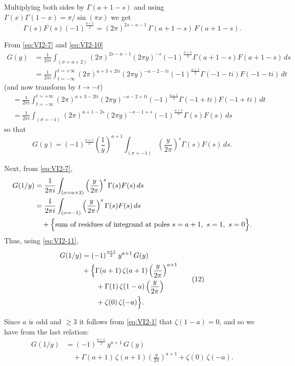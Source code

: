Multiplying both sides by $\Gamma(a+1-s)$ and using
$\Gamma(x)\Gamma(1-x)=\pi/\sin(\pi x)$ we get
\[
\Gamma(s)F(s)(-1)^{\frac{a+1}{2}}
=(2\pi)^{2s-a-1}\,\Gamma(a+1-s)\,F(a+1-s).
\tag{10}\label{eq:VI2-10}
\]

From \eqref{eq:VI2-7} and \eqref{eq:VI2-10}
\[
\begin{aligned}
G(y)&=\frac{1}{2\pi i}\int_{(\sigma=a+2)}
(2\pi)^{2s-a-1}(2\pi y)^{-s}(-1)^{\frac{a+1}{2}}
\Gamma(a+1-s)F(a+1-s)\,ds\\
&=\frac{1}{2\pi i}\int_{t=-\infty}^{t=+\infty}
(2\pi)^{a+3+2ti}(2\pi y)^{-a-2-ti}(-1)^{\frac{a+1}{2}}
\Gamma(-1-ti)F(-1-ti)\,dt
\end{aligned}
\]
(and now transform by $t\to -t$)
\[
\begin{aligned}
&=\frac{1}{2\pi i}\int_{t=-\infty}^{t=+\infty}
(2\pi)^{a+3-2ti}(2\pi y)^{-a-2+ti}(-1)^{\frac{a+1}{2}}
\Gamma(-1+ti)F(-1+ti)\,dt\\
&=\frac{1}{2\pi i}\int_{(\sigma=-1)}
(2\pi)^{a+1-2s}(2\pi y)^{-a-1+s}(-1)^{\frac{a+1}{2}}
\Gamma(s)F(s)\,ds
\end{aligned}
\]
so that
\[
G(y)=(-1)^{\frac{a+1}{2}}\left(\frac{1}{y}\right)^{a+1}
\int_{(\sigma=-1)}\left(\frac{y}{2\pi}\right)^{s}\Gamma(s)F(s)\,ds.
\tag{11}\label{eq:VI2-11}
\]

Next, from \eqref{eq:VI2-7},
\[
\begin{aligned}
G(1/y)&=\frac{1}{2\pi i}\int_{(\sigma=a+2)}\left(\frac{y}{2\pi}\right)^{s}
\Gamma(s)F(s)\,ds\\
&=\frac{1}{2\pi i}\int_{(\sigma=-1)}\left(\frac{y}{2\pi}\right)^{s}
\Gamma(s)F(s)\,ds\\
&\quad+\Bigl\{\text{sum of residues of integrand at poles }
s=a+1,\ s=1,\ s=0\Bigr\}.
\end{aligned}
\]
Thus, using \eqref{eq:VI2-11},
\[
\begin{aligned}
G(1/y)&=(-1)^{\frac{a+1}{2}}\,y^{a+1}\,G(y)\\
&+\Bigl\{\Gamma(a+1)\,\zeta(a+1)\left(\frac{y}{2\pi}\right)^{a+1}\\
&\qquad+\Gamma(1)\,\zeta(1-a)\left(\frac{y}{2\pi}\right)\\
&\qquad+\zeta(0)\,\zeta(-a)\Bigr\}.
\end{aligned}
\tag{12}\label{eq:VI2-12}
\]

Since $a$ is odd and $\geq 3$ it follows from \eqref{eq:VI2-1} that
$\zeta(1-a)=0$, and so we have from the last relation:
\[
\begin{aligned}
G(1/y)&=(-1)^{\frac{a+1}{2}}\,y^{a+1}\,G(y)\\
&\quad+\Gamma(a+1)\,\zeta(a+1)\left(\frac{y}{2\pi}\right)^{a+1}
+\zeta(0)\,\zeta(-a).
\end{aligned}
\]

